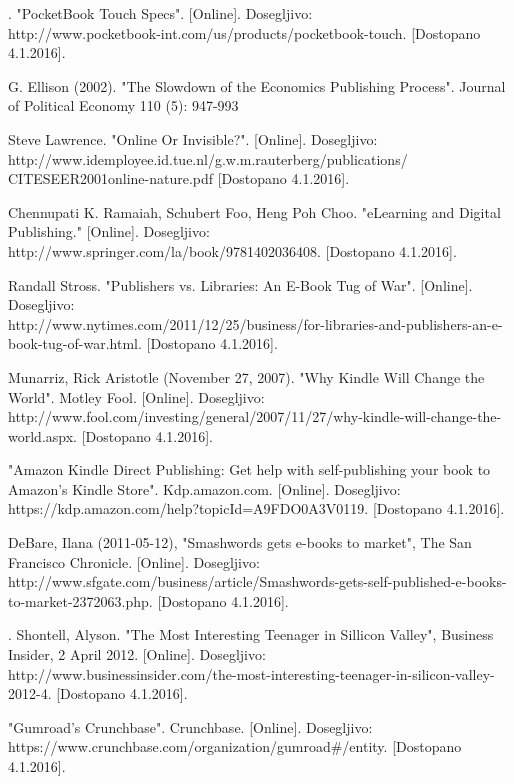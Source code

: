 \documentclass[a4paper, 12pt]{book}
\begin{document}
\begin{thebibliography}{99}
. "PocketBook Touch Specs". 
[Online]. Dosegljivo:\\ http://www.pocketbook-int.com/us/products/pocketbook-touch.
[Dostopano 4.1.2016].


 G. Ellison (2002). "The Slowdown of the Economics Publishing Process". Journal of Political Economy 110 (5): 947-993

 Steve Lawrence. "Online Or Invisible?". 
[Online]. Dosegljivo:\\ http://www.idemployee.id.tue.nl/g.w.m.rauterberg/publications/
CITESEER2001online-nature.pdf
[Dostopano 4.1.2016].

 Chennupati K. Ramaiah, Schubert Foo, Heng Poh Choo. "eLearning and Digital Publishing."
[Online]. Dosegljivo:\\ http://www.springer.com/la/book/9781402036408.
[Dostopano 4.1.2016].

 Randall Stross. "Publishers vs. Libraries: An E-Book Tug of War".
[Online]. Dosegljivo:\\ http://www.nytimes.com/2011/12/25/business/for-libraries-and-publishers-an-e-book-tug-of-war.html.
[Dostopano 4.1.2016].

 Munarriz, Rick Aristotle (November 27, 2007). "Why Kindle Will Change the World". Motley Fool.
[Online]. Dosegljivo:\\ http://www.fool.com/investing/general/2007/11/27/why-kindle-will-change-the-world.aspx.
[Dostopano 4.1.2016].

 "Amazon Kindle Direct Publishing: Get help with self-publishing your book to Amazon's Kindle Store". Kdp.amazon.com.
[Online]. Dosegljivo:\\ https://kdp.amazon.com/help?topicId=A9FDO0A3V0119.
[Dostopano 4.1.2016].

 DeBare, Ilana (2011-05-12), "Smashwords gets e-books to market", The San Francisco Chronicle.
[Online]. Dosegljivo:\\ http://www.sfgate.com/business/article/Smashwords-gets-self-published-e-books-to-market-2372063.php.
[Dostopano 4.1.2016].

. Shontell, Alyson. "The Most Interesting Teenager in Sillicon Valley", Business Insider, 2 April 2012. 
[Online]. Dosegljivo:\\ http://www.businessinsider.com/the-most-interesting-teenager-in-silicon-valley-2012-4.
[Dostopano 4.1.2016].

 "Gumroad’s Crunchbase". Crunchbase.
[Online]. Dosegljivo:\\ https://www.crunchbase.com/organization/gumroad\#/entity.
[Dostopano 4.1.2016].


\end{thebibliography}
\end{document}
